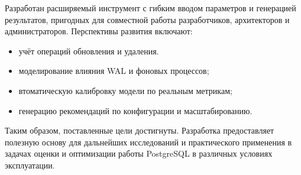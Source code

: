 Разработан расширяемый инструмент с гибким вводом параметров и генерацией результатов, пригодных для совместной работы разработчиков, архитекторов и администраторов. Перспективы развития включают:

\begin{itemize}[leftmargin=*,align=left]
    \item учёт операций обновления и удаления.\
    \item моделирование влияния WAL и фоновых процессов; \
    \item втоматическую калибровку модели по реальным метрикам; \
    \item генерацию рекомендаций по конфигурации и масштабированию. \
\end{itemize}

Таким образом, поставленные цели достигнуты. Разработка предоставляет полезную основу для дальнейших исследований и практического применения в задачах оценки и оптимизации работы PostgreSQL в различных условиях эксплуатации.
